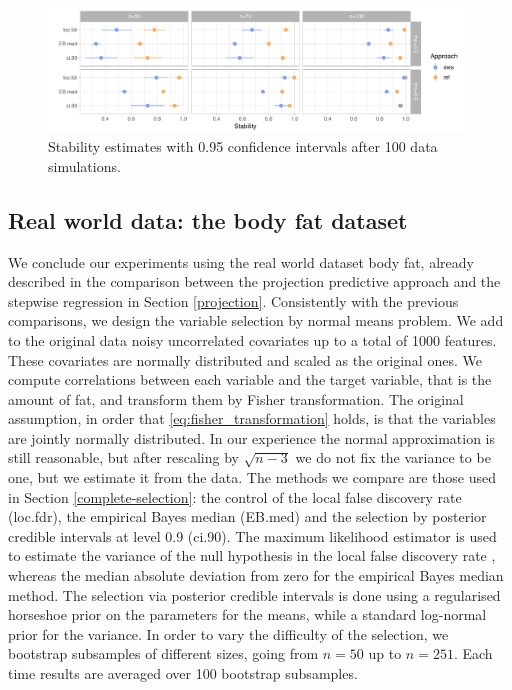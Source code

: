 \documentclass[american,]{article}
\theoremstyle{definition}
\begin{document}
\begin{figure}[tp]
  \centering
  \includegraphics[width=0.98\textwidth]{graphics/stability.pdf}
  \caption{Stability estimates with 0.95 confidence intervals after 100 data simulations.\\}
  \label{fig:stability}
\end{figure}




\hypertarget{real-world-data}{%
\subsection{Real world data: the body fat dataset}\label{real-world-data}}

We conclude our experiments using the real world dataset body fat, already described in the comparison between the projection predictive approach and the stepwise regression in Section \ref{projection}. Consistently with the previous comparisons, we design the variable selection by normal means problem. We add to the original data noisy uncorrelated covariates up to a total of 1000 features. These covariates are normally distributed and scaled as the original ones. We compute correlations between each variable and the target variable, that is the amount of fat, and transform them by Fisher transformation. The original assumption, in order that \eqref{eq:fisher_transformation} holds, is that the variables are jointly normally distributed. In our experience the normal approximation is still reasonable, but after rescaling by $\sqrt{n-3}$ we do not fix the variance to be one, but we estimate it from the data. The methods we compare are those used in Section \ref{complete-selection}: the control of the local false discovery rate (loc.fdr), the empirical Bayes median (EB.med) and the selection by posterior credible intervals at level 0.9 (ci.90). The maximum likelihood estimator is used to estimate the variance of the null hypothesis in the local false discovery rate \cite[see][Chap. 6]{efron2012large}, whereas the median absolute deviation from zero for the empirical Bayes median method. The selection via posterior credible intervals is done using a regularised horseshoe prior on the parameters for the means, while a standard log-normal  prior for the variance. In order to vary the difficulty of the selection, we bootstrap subsamples of different sizes, going from $n=50$ up to $n=251$. Each time results are averaged over 100 bootstrap subsamples.
\end{document}
